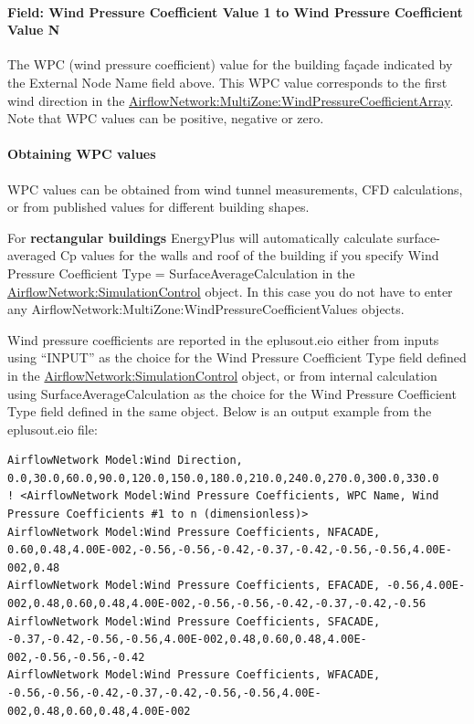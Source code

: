 \paragraph{Field: Wind Pressure Coefficient Value 1 to Wind Pressure Coefficient Value N}\label{field-wind-pressure-coefficient-value-1-to-wind-pressure-coefficient-value-n}

The WPC (wind pressure coefficient) value for the building fa\c{c}ade indicated by the External Node Name field above. This WPC value corresponds to the first wind direction in the \hyperref[airflownetworkmultizonewindpressurecoefficientarray]{AirflowNetwork:MultiZone:WindPressureCoefficientArray}. Note that WPC values can be positive, negative or zero.

\paragraph{Obtaining WPC values}\label{obtaining-wpc-values}

WPC values can be obtained from wind tunnel measurements, CFD calculations, or from published values for different building shapes.

For \textbf{rectangular buildings} EnergyPlus will automatically calculate surface-averaged Cp values for the walls and roof of the building if you specify Wind Pressure Coefficient Type = SurfaceAverageCalculation in the \hyperref[airflownetworksimulationcontrol]{AirflowNetwork:\hyperref[simulationcontrol]{SimulationControl}} object. In this case you do not have to enter any AirflowNetwork:MultiZone:WindPressureCoefficientValues objects.

Wind pressure coefficients are reported in the eplusout.eio either from inputs using ``INPUT'' as the choice for the Wind Pressure Coefficient Type field defined in the \hyperref[airflownetworksimulationcontrol]{AirflowNetwork:\hyperref[simulationcontrol]{SimulationControl}} object, or from internal calculation using SurfaceAverageCalculation as the choice for the Wind Pressure Coefficient Type field defined in the same object. Below is an output example from the eplusout.eio file:

\begin{lstlisting}
AirflowNetwork Model:Wind Direction, 0.0,30.0,60.0,90.0,120.0,150.0,180.0,210.0,240.0,270.0,300.0,330.0
! <AirflowNetwork Model:Wind Pressure Coefficients, WPC Name, Wind Pressure Coefficients #1 to n (dimensionless)>
AirflowNetwork Model:Wind Pressure Coefficients, NFACADE, 0.60,0.48,4.00E-002,-0.56,-0.56,-0.42,-0.37,-0.42,-0.56,-0.56,4.00E-002,0.48
AirflowNetwork Model:Wind Pressure Coefficients, EFACADE, -0.56,4.00E-002,0.48,0.60,0.48,4.00E-002,-0.56,-0.56,-0.42,-0.37,-0.42,-0.56
AirflowNetwork Model:Wind Pressure Coefficients, SFACADE, -0.37,-0.42,-0.56,-0.56,4.00E-002,0.48,0.60,0.48,4.00E-002,-0.56,-0.56,-0.42
AirflowNetwork Model:Wind Pressure Coefficients, WFACADE, -0.56,-0.56,-0.42,-0.37,-0.42,-0.56,-0.56,4.00E-002,0.48,0.60,0.48,4.00E-002
\end{lstlisting}

